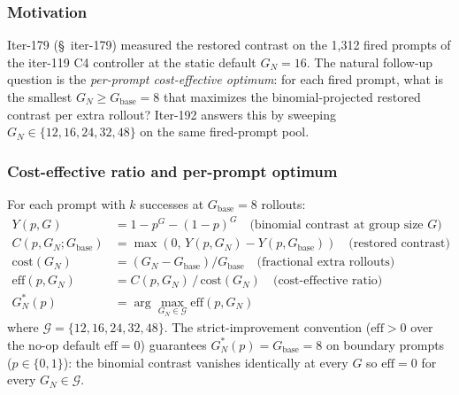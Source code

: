 
\subsubsection*{Motivation}

Iter-179 (\S~iter-179) measured the restored contrast on the 1,312 fired
prompts of the iter-119 C4 controller at the static default
$G_N{=}16$. The natural follow-up question is the \emph{per-prompt
cost-effective optimum}: for each fired prompt, what is the smallest
$G_N \ge G_{\mathrm{base}}{=}8$ that maximizes the binomial-projected
restored contrast per extra rollout? Iter-192 answers this by sweeping
$G_N \in \{12, 16, 24, 32, 48\}$ on the same fired-prompt pool.

\subsubsection*{Cost-effective ratio and per-prompt optimum}

For each prompt with $k$ successes at $G_{\mathrm{base}}{=}8$ rollouts:
\begin{align}
Y(p, G) &= 1 - p^G - (1-p)^G \quad\text{(binomial contrast at group size $G$)}\\
C(p, G_N; G_{\mathrm{base}}) &= \max(0,\, Y(p, G_N) - Y(p, G_{\mathrm{base}}))\quad\text{(restored contrast)}\\
\mathrm{cost}(G_N) &= (G_N - G_{\mathrm{base}}) / G_{\mathrm{base}}\quad\text{(fractional extra rollouts)}\\
\mathrm{eff}(p, G_N) &= C(p, G_N) \,/\, \mathrm{cost}(G_N)\quad\text{(cost-effective ratio)}\\
G_N^*(p) &= \arg\max_{G_N \in \mathcal{G}} \mathrm{eff}(p, G_N)
\label{eq:iter192-eff}
\end{align}
where $\mathcal{G} = \{12, 16, 24, 32, 48\}$. The strict-improvement
convention ($\mathrm{eff} > 0$ over the no-op default
$\mathrm{eff}=0$) guarantees $G_N^*(p) = G_{\mathrm{base}}{=}8$ on
boundary prompts ($p \in \{0, 1\}$): the binomial contrast vanishes
identically at every $G$ so $\mathrm{eff} = 0$ for every $G_N \in
\mathcal{G}$.

